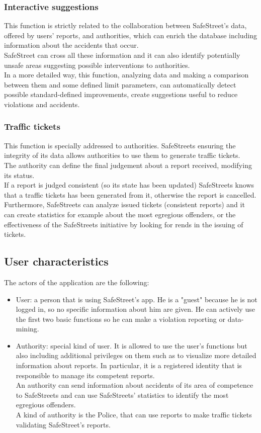 \documentclass{article}
\begin{document}
	\subsubsection{Interactive suggestions}
	This function is strictly related to the collaboration between SafeStreet's data, offered by users' reports, and authorities, which can enrich the database including information about the accidents that occur. \\SafeStreet can cross all these information and it can also identify potentially unsafe areas suggesting possible interventions to authorities. \\
	In a more detailed way, this function, analyzing data and making a comparison between them and some defined limit parameters, can automatically detect possible standard-defined improvements, create suggestions useful to reduce violations and accidents.
	
	\subsubsection{Traffic tickets}
	This function is specially addressed to authorities. SafeStreets ensuring the integrity of its data allows authorities to use them to generate traffic tickets. \\
	The authority can define the final judgement about a report received, modifying its status.\\
	If a report is judged consistent (so its state has been updated) SafeStreets knows that a traffic tickets has been generated from it, otherwise the report is cancelled.\\
	Furthermore, SafeStreets can analyze issued tickets (consistent reports) and it can create statistics for example about the most egregious offenders, or the effectiveness of the SafeStreets initiative by looking for rends in the issuing of tickets.
	
	
	\subsection{User characteristics}
	The actors of the application are the following:
	\begin{itemize}
		\item User: a person that is using SafeStreet's app. He is a "guest" because he is not logged in, so no specific information about him are given. He can actively use the first two basic functions so he can make a violation reporting or data-mining.
		\item Authority: special kind of user. It is allowed to use the user's functions but also including additional privileges on them such as to visualize more detailed information about reports. In particular, it is a registered identity that is responsible to manage its competent reports. \\An authority can send information about accidents of its area of competence to SafeStreets and can use SafeStreets' statistics to identify the most egregious offenders.\\
            A kind of authority is the Police, that can use reports to make traffic tickets validating SafeStreet's reports.
	\end{itemize}
	
\end{document}
